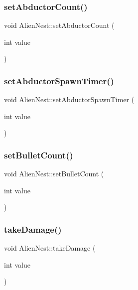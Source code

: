 \subsubsection{\texorpdfstring{set\+Abductor\+Count()}{setAbductorCount()}}
{\footnotesize\ttfamily void Alien\+Nest\+::set\+Abductor\+Count (\begin{DoxyParamCaption}\item[{int}]{value }\end{DoxyParamCaption})}

\mbox{\label{class_alien_nest_ac19100b42e3fda84431a918517411573}} 
\subsubsection{\texorpdfstring{set\+Abductor\+Spawn\+Timer()}{setAbductorSpawnTimer()}}
{\footnotesize\ttfamily void Alien\+Nest\+::set\+Abductor\+Spawn\+Timer (\begin{DoxyParamCaption}\item[{int}]{value }\end{DoxyParamCaption})}

\mbox{\label{class_alien_nest_a050a64974389f5f6d4fbd1c74aa30bb5}} 
\subsubsection{\texorpdfstring{set\+Bullet\+Count()}{setBulletCount()}}
{\footnotesize\ttfamily void Alien\+Nest\+::set\+Bullet\+Count (\begin{DoxyParamCaption}\item[{int}]{value }\end{DoxyParamCaption})}

\mbox{\label{class_alien_nest_a49b484cdb9ba5c49e1d2912f359b66c5}} 
\subsubsection{\texorpdfstring{take\+Damage()}{takeDamage()}}
{\footnotesize\ttfamily void Alien\+Nest\+::take\+Damage (\begin{DoxyParamCaption}\item[{int}]{value }\end{DoxyParamCaption})}


